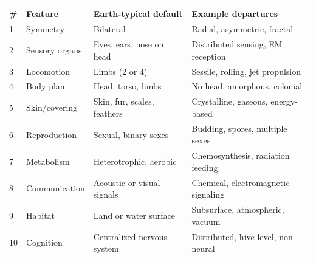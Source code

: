 \begin{tabular}{llll}
\toprule
\# & Feature & Earth-typical default & Example departures \\
\midrule
1 & Symmetry & Bilateral & Radial, asymmetric, fractal \\
2 & Sensory organs & Eyes, ears, nose on head & Distributed sensing, EM reception \\
3 & Locomotion & Limbs (2 or 4) & Sessile, rolling, jet propulsion \\
4 & Body plan & Head, torso, limbs & No head, amorphous, colonial \\
5 & Skin/covering & Skin, fur, scales, feathers & Crystalline, gaseous, energy-based \\
6 & Reproduction & Sexual, binary sexes & Budding, spores, multiple sexes \\
7 & Metabolism & Heterotrophic, aerobic & Chemosynthesis, radiation feeding \\
8 & Communication & Acoustic or visual signals & Chemical, electromagnetic signaling \\
9 & Habitat & Land or water surface & Subsurface, atmospheric, vacuum \\
10 & Cognition & Centralized nervous system & Distributed, hive-level, non-neural \\
\bottomrule
\end{tabular}
